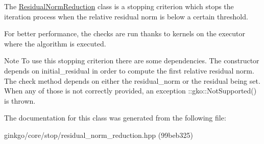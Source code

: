 The \hyperlink{classgko_1_1stop_1_1ResidualNormReduction}{Residual\+Norm\+Reduction} class is a stopping criterion which stops the iteration process when the relative residual norm is below a certain threshold. 

For better performance, the checks are run thanks to kernels on the executor where the algorithm is executed.

\begin{DoxyNote}{Note}
To use this stopping criterion there are some dependencies. The constructor depends on {\ttfamily initial\+\_\+residual} in order to compute the first relative residual norm. The check method depends on either the {\ttfamily residual\+\_\+norm} or the {\ttfamily residual} being set. When any of those is not correctly provided, an exception \+::gko\+::\+Not\+Supported() is thrown. 
\end{DoxyNote}


The documentation for this class was generated from the following file\+:\begin{DoxyCompactItemize}
\item 
ginkgo/core/stop/residual\+\_\+norm\+\_\+reduction.\+hpp (99beb325)\end{DoxyCompactItemize}
